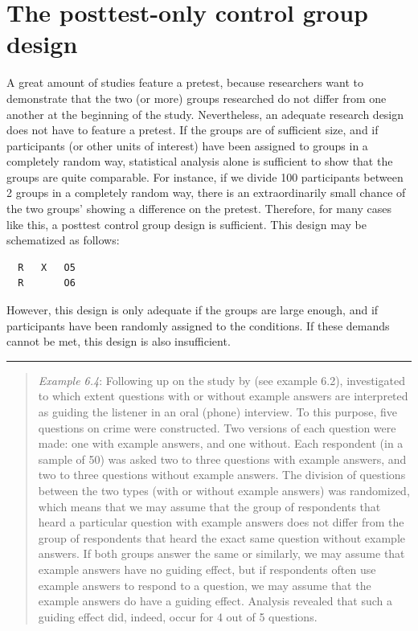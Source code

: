 \documentclass[
]{book}
\begin{document}
\hypertarget{the-posttest-only-control-group-design}{%
\section{The posttest-only control group design}\label{the-posttest-only-control-group-design}}

A great amount of studies feature a pretest, because researchers want to demonstrate that the two (or more) groups researched do not differ from one another at the beginning of the study. Nevertheless, an adequate research design does not have to feature a pretest. If the groups are of sufficient size, and if participants (or other units of interest) have been assigned to groups in a completely random way, statistical analysis alone is sufficient to show that the groups are quite comparable. For instance, if we divide 100 participants between 2 groups in a completely random way, there is an extraordinarily small chance of the two groups' showing a difference on the pretest. Therefore, for many cases like this, a posttest control group design is sufficient. This design may be schematized as follows:

\begin{verbatim}
  R   X   O5
  R       O6
\end{verbatim}

However, this design is only adequate if the groups are large enough, and if participants have been randomly assigned to the conditions. If these demands cannot be met, this design is also insufficient.

\begin{center}\rule{0.5\linewidth}{0.5pt}\end{center}

\begin{quote}
\emph{Example 6.4}: Following up on the study by \citet{Houtk91} (see example 6.2), \citet{Wijff92} investigated to which extent questions with or without example answers are interpreted as guiding the listener in an oral (phone) interview. To this purpose, five questions on crime were constructed. Two versions of each question were made: one with example answers, and one without. Each respondent (in a sample of 50) was asked two to three questions with example answers, and two to three questions without example answers. The division of questions between the two types (with or without example answers) was randomized, which means that we may assume that the group of respondents that heard a particular question with example answers does not differ from the group of respondents that heard the exact same question without example answers. If both groups answer the same or similarly, we may assume that example answers have no guiding effect, but if respondents often use example answers to respond to a question, we may assume that the example answers do have a guiding effect. Analysis revealed that such a guiding effect did, indeed, occur for 4 out of 5 questions.
\end{quote}
\end{document}
